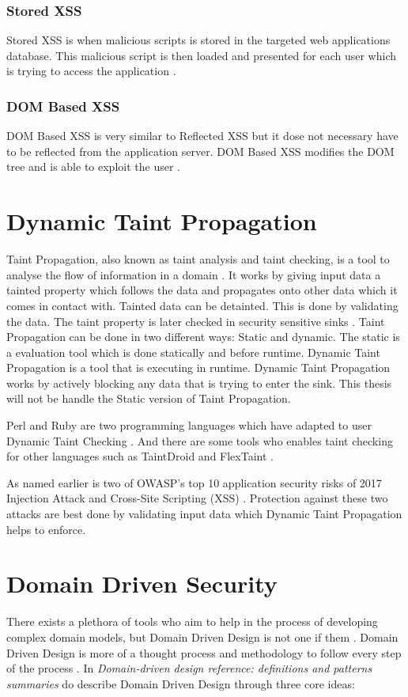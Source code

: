 \subsubsection{Stored XSS}
Stored XSS is when malicious scripts is stored in the targeted web applications database. This malicious script is then loaded and presented for each user which is trying to access the application \parencite{Secure_Web}.


\subsubsection{DOM Based XSS}
DOM Based XSS is very similar to Reflected XSS but it dose not necessary have to be reflected from the application server. DOM Based XSS modifies the DOM tree and is able to exploit the user \parencite{Secure_Web}.


\section{Dynamic Taint Propagation}
Taint Propagation, also known as taint analysis and taint checking, is a tool to analyse the flow of information in a domain \parencite{Pan2015}. It works by giving input data a tainted property which follows the data and propagates onto other data which it comes in contact with. Tainted data can be detainted. This is done by validating the data. The taint property is later checked in security sensitive sinks \parencite{Pan2015}. Taint Propagation can be done in two different ways: Static and dynamic. The static is a evaluation tool which is done statically and before runtime. Dynamic Taint Propagation is a tool that is executing in runtime. Dynamic Taint Propagation works by actively blocking any data that is trying to enter the sink. This thesis will not be handle the Static version of Taint Propagation. 

Perl and Ruby are two programming languages which have adapted to user Dynamic Taint Checking \parencite{perl, ruby}. And there are some tools who enables taint checking for other languages such as TaintDroid \parencite{Ma2010} and FlexTaint \parencite{Venkataramani2008}.

As named earlier is two of OWASP's top 10 application security risks of 2017 Injection Attack and Cross-Site Scripting (XSS) \parencite{OWASP2017}. Protection against these two attacks are best done by validating input data which Dynamic Taint Propagation helps to enforce.


\section{Domain Driven Security}
There exists a plethora of tools who aim to help in the process of developing complex domain models, but Domain Driven Design is not one if them \parencite{Bankes, 10.1007/978-3-319-24309-2_33}. Domain Driven Design is more of a thought process and methodology to follow every step of the process \parencite{EvansEric2004Dd:t}. In \emph{Domain-driven design reference: definitions and patterns summaries} do \textcite{evans_2015} describe Domain Driven Design through three core ideas:

